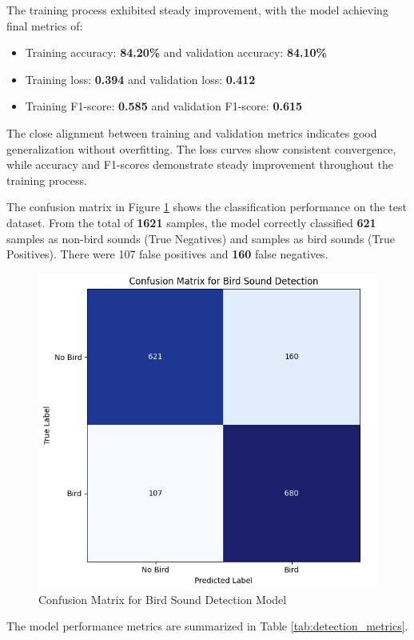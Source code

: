 The training process exhibited steady improvement, with the model achieving final metrics of:
\begin{itemize}
      \item Training accuracy: \textbf{84.20\%} and validation accuracy: \textbf{84.10\%}
            \item Training loss: \textbf{0.394} and validation loss: \textbf{0.412}
            \item Training F1-score: \textbf{0.585} and validation F1-score: \textbf{0.615}
      \end{itemize}

The close alignment between training and validation metrics indicates good generalization without overfitting. The loss curves show consistent convergence, while accuracy and F1-scores demonstrate steady improvement throughout the training process.

The confusion matrix in Figure \ref{fig:Confusion Matrix for Detection Model} shows the classification performance on the test dataset. From the total of \textbf{1621} samples, the model correctly classified \textbf{621} samples as non-bird sounds (True Negatives) and  samples as bird sounds (True Positives). There were 107 false positives and \textbf{160} false negatives.
\begin{figure}[h!]
      \centering
      \includegraphics[scale=0.58]{images/det_confusionmatrix.png}
      \caption{Confusion Matrix for Bird Sound Detection Model}
      \label{fig:Confusion Matrix for Detection Model}
\end{figure}
The model performance metrics are summarized in Table \ref{tab:detection_metrics}.


